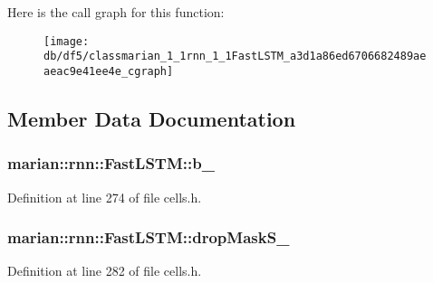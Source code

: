 Here is the call graph for this function\+:
\nopagebreak
\begin{figure}[H]
\begin{center}
\leavevmode
\texttt{[image: db/df5/classmarian\_1\_1rnn\_1\_1FastLSTM\_a3d1a86ed6706682489aeaeac9e41ee4e\_cgraph]}
\end{center}
\end{figure}




\subsection{Member Data Documentation}
\subsubsection[{\texorpdfstring{b\+\_\+}{b_}}]{ marian\+::rnn\+::\+Fast\+L\+S\+T\+M\+::b\+\_\+\hspace{0.3cm}{\ttfamily [protected]}}\hypertarget{classmarian_1_1rnn_1_1FastLSTM_a4b637d17c49e8d687f1a4b3747d0e191}{}\label{classmarian_1_1rnn_1_1FastLSTM_a4b637d17c49e8d687f1a4b3747d0e191}


Definition at line 274 of file cells.\+h.

\subsubsection[{\texorpdfstring{drop\+Mask\+S\+\_\+}{dropMaskS_}}]{ marian\+::rnn\+::\+Fast\+L\+S\+T\+M\+::drop\+Mask\+S\+\_\+\hspace{0.3cm}{\ttfamily [protected]}}\hypertarget{classmarian_1_1rnn_1_1FastLSTM_adbc5704ab5b1cc30e29861e9653bd0a3}{}\label{classmarian_1_1rnn_1_1FastLSTM_adbc5704ab5b1cc30e29861e9653bd0a3}


Definition at line 282 of file cells.\+h.

